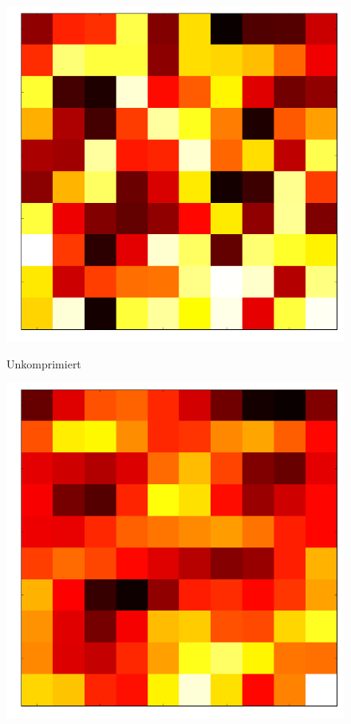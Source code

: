             \begin{multicols}{2}
                \begin{figure}[H]
                    \begin{center}
                        \includegraphics[scale=0.3]{../pictures/DCT-pre.png}\\
                        \caption{Unkomprimiert}\label{fig:dct-pre}
                    \end{center}
                \end{figure}
                \par
                \begin{figure}[H]
                    \begin{center}
                        \includegraphics[scale=0.3]{../pictures/DCT-after.png}\\

\end{center}
\end{figure}
\end{multicols}
